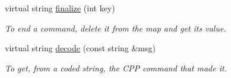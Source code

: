 \begin{DoxyCompactItemize}
virtual string \hyperlink{classMapper_a568fcb8dba98cb9d37700972ef5d8df0}{finalize} (int key)
\begin{DoxyCompactList}\small\item\em To end a command, delete it from the map and get its value. \item\end{DoxyCompactList}\item 
virtual string \hyperlink{classMapper_a5e51b9148704b25e26e5ec48bd643a0b}{decode} (const string \&msg)
\begin{DoxyCompactList}\small\item\em To get, from a coded string, the CPP command that made it. \item\end{DoxyCompactList}\end{DoxyCompactItemize}
